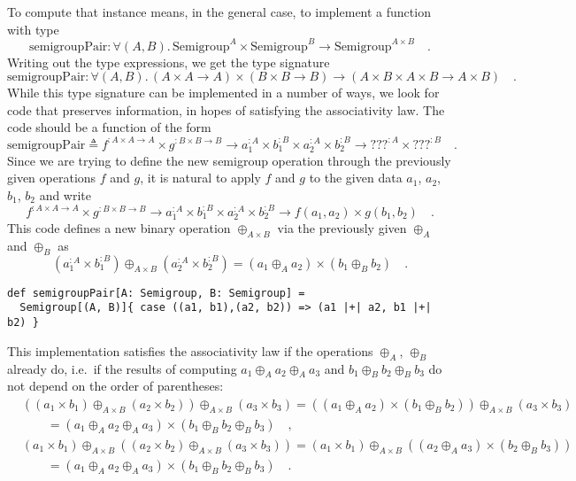 To compute that instance means, in the general case, to implement
a function with type
\[
\text{semigroupPair}:\forall(A,B).\,\text{Semigroup}^{A}\times\text{Semigroup}^{B}\rightarrow\text{Semigroup}^{A\times B}\quad.
\]
Writing out the type expressions, we get the type signature
\[
\text{semigroupPair}:\forall(A,B).\,\left(A\times A\rightarrow A\right)\times\left(B\times B\rightarrow B\right)\rightarrow\left(A\times B\times A\times B\rightarrow A\times B\right)\quad.
\]
While this type signature can be implemented in a number of ways,
we look for code that preserves information, in hopes of satisfying
the associativity law. The code should be a function of the form
\[
\text{semigroupPair}\triangleq f^{:A\times A\rightarrow A}\times g^{:B\times B\rightarrow B}\rightarrow a_{1}^{:A}\times b_{1}^{:B}\times a_{2}^{:A}\times b_{2}^{:B}\rightarrow???^{:A}\times???^{:B}\quad.
\]
Since we are trying to define the new semigroup operation through
the previously given operations $f$ and $g$, it is natural to apply
$f$ and $g$ to the given data $a_{1}$, $a_{2}$, $b_{1}$, $b_{2}$
and write 
\[
f^{:A\times A\rightarrow A}\times g^{:B\times B\rightarrow B}\rightarrow a_{1}^{:A}\times b_{1}^{:B}\times a_{2}^{:A}\times b_{2}^{:B}\rightarrow f(a_{1},a_{2})\times g(b_{1},b_{2})\quad.
\]
This code defines a new binary operation $\oplus_{A\times B}$ via
the previously given $\oplus_{A}$ and $\oplus_{B}$ as
\begin{equation}
(a_{1}^{:A}\times b_{1}^{:B})\oplus_{A\times B}(a_{2}^{:A}\times b_{2}^{:B})=(a_{1}\oplus_{A}a_{2})\times(b_{1}\oplus_{B}b_{2})\quad.\label{eq:semigroup-product-operation-def}
\end{equation}
\begin{lstlisting}
def semigroupPair[A: Semigroup, B: Semigroup] =
  Semigroup[(A, B)]{ case ((a1, b1),(a2, b2)) => (a1 |+| a2, b1 |+| b2) }
\end{lstlisting}
This implementation satisfies the associativity law if the operations
$\oplus_{A}$, $\oplus_{B}$ already do, i.e.~if the results of computing
$a_{1}\oplus_{A}a_{2}\oplus_{A}a_{3}$ and $b_{1}\oplus_{B}b_{2}\oplus_{B}b_{3}$
do not depend on the order of parentheses:
\begin{align*}
 & \left(\left(a_{1}\times b_{1}\right)\oplus_{A\times B}\left(a_{2}\times b_{2}\right)\right)\oplus_{A\times B}\left(a_{3}\times b_{3}\right)=\left((a_{1}\oplus_{A}a_{2})\times(b_{1}\oplus_{B}b_{2})\right)\oplus_{A\times B}\left(a_{3}\times b_{3}\right)\\
 & \quad\quad=\left(a_{1}\oplus_{A}a_{2}\oplus_{A}a_{3}\right)\times\left(b_{1}\oplus_{B}b_{2}\oplus_{B}b_{3}\right)\quad,\\
 & \left(a_{1}\times b_{1}\right)\oplus_{A\times B}\left(\left(a_{2}\times b_{2}\right)\oplus_{A\times B}\left(a_{3}\times b_{3}\right)\right)=\left(a_{1}\times b_{1}\right)\oplus_{A\times B}\left((a_{2}\oplus_{A}a_{3})\times(b_{2}\oplus_{B}b_{3})\right)\\
 & \quad\quad=\left(a_{1}\oplus_{A}a_{2}\oplus_{A}a_{3}\right)\times\left(b_{1}\oplus_{B}b_{2}\oplus_{B}b_{3}\right)\quad.
\end{align*}


